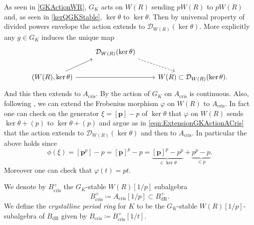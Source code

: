 \begin{rem}[]
	As seen in \cref{GKActionWR}, $G_K$ acts on $W(R)$ sending $pW(R)$ to $pW(R)$
	and, as seen in \cref{kerQGKStable}, $\ker\theta$ to $\ker\theta$.
	Then by universal property of divided powers envelope the action extends to
	$\mathcal{D}_{W(R)}(\ker\theta)$.
	More explicitly any $g \in G_K$ induces the unique map
	\begin{equation}\label{eqn:ExtensionGKActionACris}
	\begin{tikzcd}
		&
		\mathcal{D}_{W(R)}(\ker\theta)
		\arrow[rd, "", dashrightarrow,
		start anchor=south east] & \\
		\left(W(R), \ker\theta\right) \arrow[ru, "", rightarrow,
		end anchor=south west] 
		\arrow[rr, "", rightarrow] & &
		W(R) \subset \mathcal{D}_{W(R)}(\ker\theta) 
	.\end{tikzcd}
	\end{equation}
	And this then extends to $A_{\mathrm{cris}}$.
	By {\cite[Proposition 9.1.2]{Brinon}} the action
	of $G_K$ on $A_{\mathrm{cris}}$ is continuous.
	Also, following {\cite[Lemmas 9.1.7-9.1.8]{Brinon}},
	we can extend the Frobenius morphism $\varphi$ on $W(R)$ to 
	$A_{\mathrm{cris}}$.
	In fact one can check on the generator $\xi = [\mathbf{p}] - p$
	of $\ker \theta$ that $\varphi$ on $W(R)$ sends $\ker\theta + (p)$ to
	$\ker\theta + (p)$ and argue as in \cref{eqn:ExtensionGKActionACris}
	that the action extends to $\mathcal{D}_{W(R)}(\ker\theta)$
	and then to $A_{\mathrm{cris}}$.
	In particular the above holds since
	\begin{equation*}
		\phi(\xi) = [\mathbf{p}^p] - p =
		[\mathbf{p}]^p - p =
		\underbrace{[\mathbf{p}]^p - p^p}_{\in \ker\theta} + 
		\underbrace{p^p - p}_{\in p}
	.\end{equation*}
	Moreover one can check that $\varphi(t) = pt$.
\end{rem}


\begin{defn}[]
	We denote by $B_{\mathrm{cris}}^+$ the $G_K$-stable $W(R)[1/p]$ subalgebra 
	\begin{equation*}
	B_{\mathrm{cris}}^+ \coloneqq A_{\mathrm{cris}}[1/p] \subset B_{\mathrm{dR}}^+
	.\end{equation*}
	We define the {\em crystalline period ring} for $K$
	to be the $G_K$-stable $W(R)[1/p]$-subalgebra of $B_{\mathrm{dR}}$
	given by $B_{\mathrm{cris}} \coloneqq B_{\mathrm{cris}}^+[1/t]$.
\end{defn}


